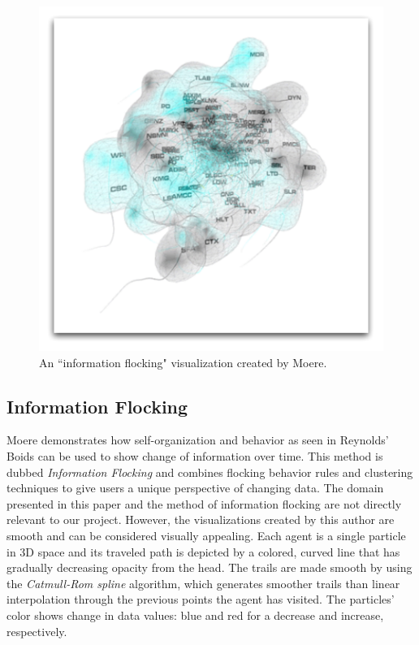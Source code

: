 \documentclass[conference]{IEEEtran}
\begin{document}
\begin{figure}
\centering
\includegraphics[scale=.5]{images/blob.pdf}
\caption{An ``information flocking" visualization created by Moere\cite{1382896}.}
\label{Blob}
\end{figure}

\subsection{Information Flocking}
Moere demonstrates how self-organization and behavior as seen in Reynolds' Boids can be used to show change of information over time\cite{1382896}. This method is dubbed {\em Information Flocking} and combines flocking behavior rules and clustering techniques to give users a unique perspective of changing data.
The domain presented in this paper and the method of information flocking are not directly relevant to our project.
However, the visualizations created by this author are smooth and can be considered visually appealing.
Each agent is a single particle in 3D space and its traveled path is depicted by a colored,
curved line that has gradually decreasing opacity from the head.
The trails are made smooth by using the {\em Catmull-Rom spline} algorithm,
which generates smoother trails than linear interpolation through the previous points the agent has visited.
The particles' color shows change in data values: blue and red for a decrease and increase, respectively.
\end{document}
